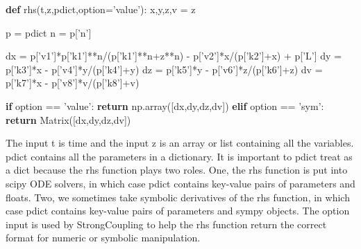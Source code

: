 \documentclass[english,a4paper,oneside]{article}
\newenvironment{Shaded}{}{}
\newcommand{\ControlFlowTok}[1]{\textcolor[rgb]{0.00,0.44,0.13}{\textbf{#1}}}
\newcommand{\KeywordTok}[1]{\textcolor[rgb]{0.00,0.44,0.13}{\textbf{#1}}}
\newcommand{\NormalTok}[1]{#1}
\newcommand{\OperatorTok}[1]{\textcolor[rgb]{0.40,0.40,0.40}{#1}}
\newcommand{\StringTok}[1]{\textcolor[rgb]{0.25,0.44,0.63}{#1}}
\begin{document}
\begin{Shaded}
\begin{Highlighting}[]
\KeywordTok{def}\NormalTok{ rhs(t,z,pdict,option}\OperatorTok{=}\StringTok{'value'}\NormalTok{):}
\NormalTok{    x,y,z,v }\OperatorTok{=}\NormalTok{ z}
    
\NormalTok{    p }\OperatorTok{=}\NormalTok{ pdict}
\NormalTok{    n }\OperatorTok{=}\NormalTok{ p[}\StringTok{'n'}\NormalTok{]}
    
\NormalTok{    dx }\OperatorTok{=}\NormalTok{ p[}\StringTok{'v1'}\NormalTok{]}\OperatorTok{*}\NormalTok{p[}\StringTok{'k1'}\NormalTok{]}\OperatorTok{**}\NormalTok{n}\OperatorTok{/}\NormalTok{(p[}\StringTok{'k1'}\NormalTok{]}\OperatorTok{**}\NormalTok{n}\OperatorTok{+}\NormalTok{z}\OperatorTok{**}\NormalTok{n) }\OperatorTok{-}\NormalTok{ p[}\StringTok{'v2'}\NormalTok{]}\OperatorTok{*}\NormalTok{x}\OperatorTok{/}\NormalTok{(p[}\StringTok{'k2'}\NormalTok{]}\OperatorTok{+}\NormalTok{x) }\OperatorTok{+}\NormalTok{ p[}\StringTok{'L'}\NormalTok{]}
\NormalTok{    dy }\OperatorTok{=}\NormalTok{ p[}\StringTok{'k3'}\NormalTok{]}\OperatorTok{*}\NormalTok{x }\OperatorTok{-}\NormalTok{ p[}\StringTok{'v4'}\NormalTok{]}\OperatorTok{*}\NormalTok{y}\OperatorTok{/}\NormalTok{(p[}\StringTok{'k4'}\NormalTok{]}\OperatorTok{+}\NormalTok{y)}
\NormalTok{    dz }\OperatorTok{=}\NormalTok{ p[}\StringTok{'k5'}\NormalTok{]}\OperatorTok{*}\NormalTok{y }\OperatorTok{-}\NormalTok{ p[}\StringTok{'v6'}\NormalTok{]}\OperatorTok{*}\NormalTok{z}\OperatorTok{/}\NormalTok{(p[}\StringTok{'k6'}\NormalTok{]}\OperatorTok{+}\NormalTok{z)}
\NormalTok{    dv }\OperatorTok{=}\NormalTok{ p[}\StringTok{'k7'}\NormalTok{]}\OperatorTok{*}\NormalTok{x }\OperatorTok{-}\NormalTok{ p[}\StringTok{'v8'}\NormalTok{]}\OperatorTok{*}\NormalTok{v}\OperatorTok{/}\NormalTok{(p[}\StringTok{'k8'}\NormalTok{]}\OperatorTok{+}\NormalTok{v)}
    
    \ControlFlowTok{if}\NormalTok{ option }\OperatorTok{==} \StringTok{'value'}\NormalTok{:}
        \ControlFlowTok{return}\NormalTok{ np.array([dx,dy,dz,dv])}
    \ControlFlowTok{elif}\NormalTok{ option }\OperatorTok{==} \StringTok{'sym'}\NormalTok{:}
        \ControlFlowTok{return}\NormalTok{ Matrix([dx,dy,dz,dv])}
\end{Highlighting}
\end{Shaded}

The input t is time and the input z is an array or list containing all
the variables. pdict contains all the parameters in a dictionary. It is
important to pdict treat as a dict because the rhs function plays two
roles. One, the rhs function is put into scipy ODE solvers, in which
case pdict contains key-value pairs of parameters and floats. Two, we
sometimes take symbolic derivatives of the rhs function, in which case
pdict contains key-value pairs of parameters and sympy objects. The
option input is used by StrongCoupling to help the rhs function return
the correct format for numeric or symbolic manipulation.
\end{document}
